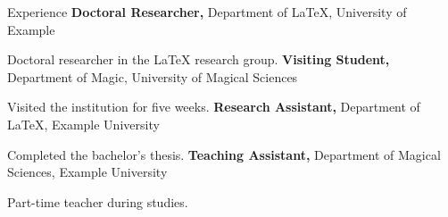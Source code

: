 \begin{rubric}{Experience}
\entry*[Aug 2023 --]
    \textbf{Doctoral Researcher,} Department of \LaTeX{}, University of Example
        
    Doctoral researcher in the \LaTeX{} research group.
%
    \textbf{Visiting Student,} Department of Magic, University of Magical Sciences

    Visited the institution for five weeks.
%
    \textbf{Research Assistant,} Department of \LaTeX{}, Example University

    Completed the bachelor's thesis.
%
    \textbf{Teaching Assistant,} Department of Magical Sciences, Example University

    Part-time teacher during studies.
\end{rubric}